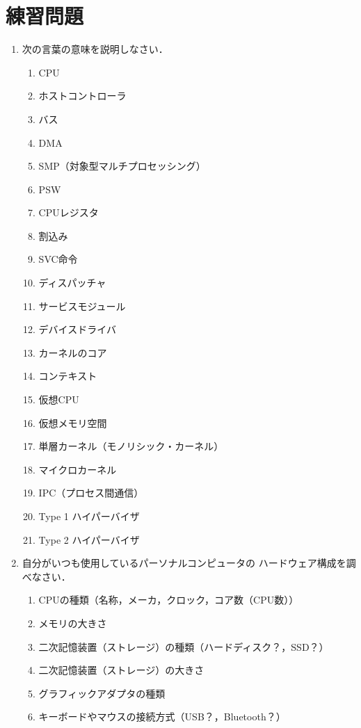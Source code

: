 \section*{練習問題}
\begin{enumerate}
  \renewcommand{\labelenumi}{\ttfamily\arabic{chapter}.\arabic{enumi}}
  \setlength{\leftskip}{1em}
\item 次の言葉の意味を説明しなさい．
  \begin{enumerate}
    \item CPU
    \item ホストコントローラ
    \item バス
    \item DMA
    \item SMP（対象型マルチプロセッシング）
    \item PSW
    \item CPUレジスタ
    \item 割込み
    \item SVC命令
    \item ディスパッチャ
    \item サービスモジュール
    \item デバイスドライバ
    \item カーネルのコア
    \item コンテキスト
    \item 仮想CPU
    \item 仮想メモリ空間
    \item 単層カーネル（モノリシック・カーネル）
    \item マイクロカーネル
    \item IPC（プロセス間通信）
    \item Type 1 ハイパーバイザ
    \item Type 2 ハイパーバイザ
  \end{enumerate}
\item 自分がいつも使用しているパーソナルコンピュータの
  ハードウェア構成を調べなさい．
  \begin{enumerate}
    \item CPUの種類（名称，メーカ，クロック，コア数（CPU数））
    \item メモリの大きさ
    \item 二次記憶装置（ストレージ）の種類（ハードディスク？，SSD？）
    \item 二次記憶装置（ストレージ）の大きさ
    \item グラフィックアダプタの種類
    \item キーボードやマウスの接続方式（USB？，Bluetooth？）
  \end{enumerate}
\end{enumerate}
